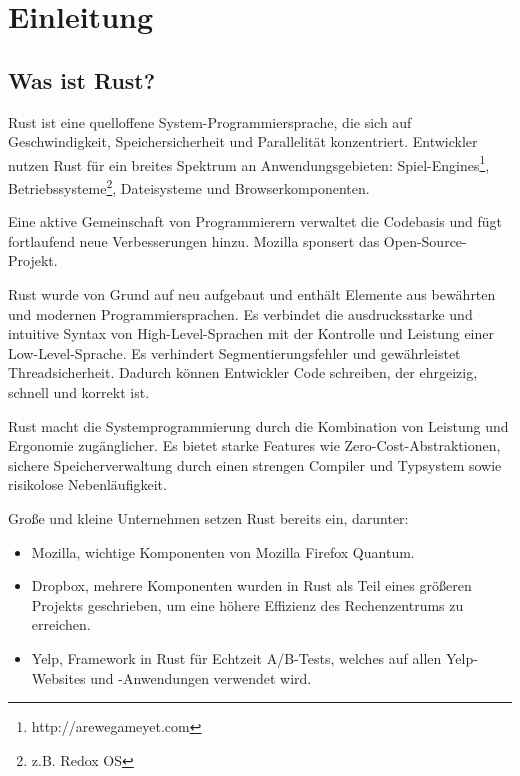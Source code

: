 \chapter{Einleitung}


\section{Was ist Rust?}

Rust ist eine quelloffene System-Programmiersprache, die sich auf Geschwindigkeit, Speichersicherheit und Parallelität konzentriert. Entwickler nutzen Rust für ein breites Spektrum an Anwendungsgebieten: Spiel-Engines\footnote{http://arewegameyet.com}, Betriebssysteme\footnote{z.B. Redox OS}, Dateisysteme und Browserkomponenten. \cite{Rust}

Eine aktive Gemeinschaft von Programmierern verwaltet die Codebasis und fügt fortlaufend neue Verbesserungen hinzu. Mozilla sponsert das Open-Source-Projekt.

Rust wurde von Grund auf neu aufgebaut und enthält Elemente aus bewährten und modernen Programmiersprachen. Es verbindet die ausdrucksstarke und intuitive Syntax von High-Level-Sprachen mit der Kontrolle und Leistung einer Low-Level-Sprache. Es verhindert Segmentierungsfehler und gewährleistet Threadsicherheit. Dadurch können Entwickler Code schreiben, der ehrgeizig, schnell und korrekt ist.

Rust macht die Systemprogrammierung durch die Kombination von Leistung und Ergonomie zugänglicher. Es bietet starke Features wie Zero-Cost-Abstraktionen, sichere Speicherverwaltung durch einen strengen Compiler und Typsystem sowie risikolose Nebenläufigkeit.

Große und kleine Unternehmen setzen Rust bereits ein, darunter:
\begin{itemize}
    \item Mozilla, wichtige Komponenten von Mozilla Firefox Quantum.
    \item Dropbox, mehrere Komponenten wurden in Rust als Teil eines größeren Projekts geschrieben, um eine höhere Effizienz des Rechenzentrums zu erreichen.
    \item Yelp, Framework in Rust für Echtzeit A/B-Tests, welches auf allen Yelp-Websites und -Anwendungen verwendet wird.
\end{itemize}
